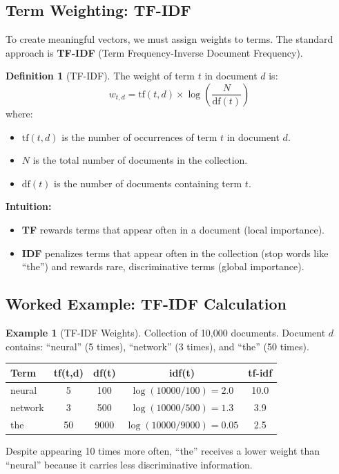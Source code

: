 \documentclass[11pt,a4paper]{article}
\theoremstyle{definition}
\newtheorem{definition}{Definition}[section]
\newtheorem{example}{Example}[section]
\theoremstyle{plain}
\begin{document}
\begin{center}

\end{center}

\subsection{Term Weighting: TF-IDF}

To create meaningful vectors, we must assign weights to terms. The standard approach is \textbf{TF-IDF} (Term Frequency-Inverse Document Frequency).

\begin{definition}[TF-IDF]
The weight of term $t$ in document $d$ is:
\[ w_{t,d} = \mathrm{tf}(t,d) \times \log\left(\frac{N}{\mathrm{df}(t)}\right) \]
where:
\begin{itemize}
    \item $\mathrm{tf}(t,d)$ is the number of occurrences of term $t$ in document $d$.
    \item $N$ is the total number of documents in the collection.
    \item $\mathrm{df}(t)$ is the number of documents containing term $t$.
\end{itemize}
\end{definition}

\textbf{Intuition:}
\begin{itemize}
    \item \textbf{TF} rewards terms that appear often in a document (local importance).
    \item \textbf{IDF} penalizes terms that appear often in the collection (stop words like ``the'') and rewards rare, discriminative terms (global importance).
\end{itemize}

\subsection{Worked Example: TF-IDF Calculation}

\begin{example}[TF-IDF Weights]
Collection of 10,000 documents. Document $d$ contains: ``neural'' (5 times), ``network'' (3 times), and ``the'' (50 times).
\begin{center}
\begin{tabular}{lcccc}
\toprule
\textbf{Term} & \textbf{tf(t,d)} & \textbf{df(t)} & \textbf{idf(t)} & \textbf{tf-idf} \\
\midrule
neural & 5 & 100 & $\log(10000/100) = 2.0$ & 10.0 \\
network & 3 & 500 & $\log(10000/500) = 1.3$ & 3.9 \\
the & 50 & 9000 & $\log(10000/9000) = 0.05$ & 2.5 \\
\bottomrule
\end{tabular}
\end{center}
Despite appearing 10 times more often, ``the'' receives a lower weight than ``neural'' because it carries less discriminative information.
\end{example}
\end{document}
